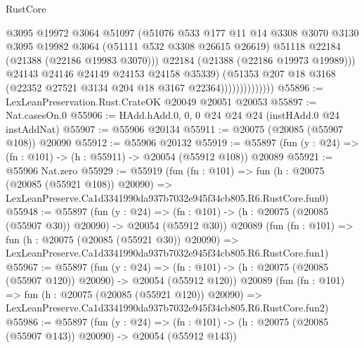 \begin{lexlean}{RustCore}
\begin{coremodule}
                                @3095
                                @19972
                                @3064
                                @51097
                                (@51076
                                  @533
                                  @177
                                  @11
                                  @14
                                  @3308
                                  @3070
                                  @3130
                                  @3095
                                  @19982
                                  @3064
                                  (@51111 @532 @3308 @26615 @26619)
                                  @51118
                                  @22184
                                  (@21388 (@22186 @19983 @3070)))
                                @22184
                                (@21388 (@22186 @19973 @19989)))
                              @24143
                              @24146
                              @24149
                              @24153
                              @24158
                              @35339)
                            (@51353
                              @207
                              @18
                              @3168
                              (@22352 @27521 @3134 @204 @18 @3167 @22364))))))))))))))
@55896 := LexLeanPreservation.Rust.CrateOK @20049 @20051 @20053
@55897 := Nat.casesOn.{0}
@55906 := HAdd.hAdd.{0, 0, 0} @24 @24 @24 (instHAdd.{0} @24 instAddNat)
@55907 := @55906 @20134
@55911 := @20075 (@20085 (@55907 @108)) @20090
@55912 := @55906 @20132
@55919 := @55897 (fun (y : @24) => (fn : @101) -> (h : @55911) -> @20054 (@55912 @108)) @20089
@55921 := @55906 Nat.zero
@55929 := @55919
    (fun (fn : @101) =>
    fun (h : @20075 (@20085 (@55921 @108)) @20090) =>
    LexLeanPreserve.Ca1d3341990da937b7032e945f34cb805.R6.RustCore.fun0)
@55948 := @55897
    (fun (y : @24) =>
    (fn : @101) -> (h : @20075 (@20085 (@55907 @30)) @20090) -> @20054 (@55912 @30))
    @20089
    (fun (fn : @101) =>
    fun (h : @20075 (@20085 (@55921 @30)) @20090) =>
    LexLeanPreserve.Ca1d3341990da937b7032e945f34cb805.R6.RustCore.fun1)
@55967 := @55897
    (fun (y : @24) =>
    (fn : @101) -> (h : @20075 (@20085 (@55907 @120)) @20090) -> @20054 (@55912 @120))
    @20089
    (fun (fn : @101) =>
    fun (h : @20075 (@20085 (@55921 @120)) @20090) =>
    LexLeanPreserve.Ca1d3341990da937b7032e945f34cb805.R6.RustCore.fun2)
@55986 := @55897
    (fun (y : @24) =>
    (fn : @101) -> (h : @20075 (@20085 (@55907 @143)) @20090) -> @20054 (@55912 @143))

\end{coremodule}
\end{lexlean}
